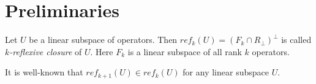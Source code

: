 \documentclass[12pt]{amsart}
\theoremstyle{case}
\begin{document}


\section{Preliminaries}
  \label{sec:preliminaries}
  \begin{definition}
    Let $U$ be a linear subspace of operators.
    Then $ref_k(U) = (F_k \cap R_\perp)^{\perp}$ is called \emph{$k$-reflexive closure} of $U$.
    Here $F_k$ is a linear subspace of all rank $k$ operators.
  \end{definition}
  It is well-known that $ref_{k + 1}(U) \in ref_k(U)$ for any linear subspace $U$.
\end{document}
